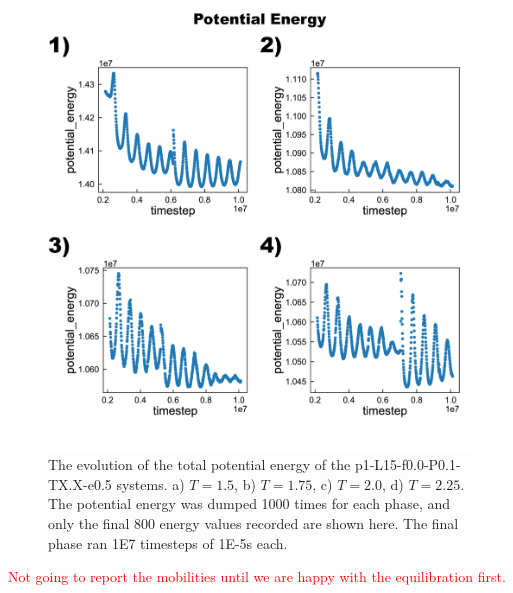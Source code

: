 \documentclass[12pt]{article}
\begin{document}
\begin{figure}[h!]\centering
	\includegraphics[width=\textwidth]{Figures/Potential_Energy.png}
    \caption{The evolution of the total potential energy of the p1-L15-f0.0-P0.1-TX.X-e0.5 systems.
        a) $T = 1.5$, b) $T = 1.75$, c) $T = 2.0$, d) $T = 2.25$.
    The potential energy was dumped 1000 times for each phase, and only the final 800 energy values recorded are shown here.
    The final phase ran 1E7 timesteps of 1E-5s each.
}
	\label{fig:PE}
\end{figure}


\textcolor{red}{Not going to report the mobilities until we are happy with the equilibration first.}




\end{document}
